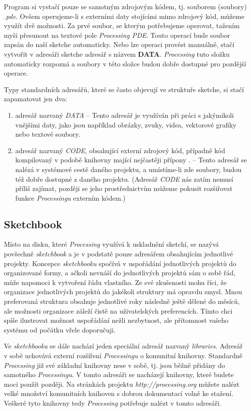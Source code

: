 \documentclass[10pt,twoside=true,open=right,cleardoublepage=empty,chapterprefix=true]{scrbook}
\newcommand{\pododdil}[1]{\subsection{#1}\index{#1}\label{#1}}
\newcommand{\slovnik}[1]{\textbf{\gls{#1}}\index{#1}\label{#1}}
\newcommand{\lnb}{\linebreak}
\begin{document}
Program si vystačí pouze se samotným zdrojovým kódem, tj. souborem (soubory) {\em *.pde}. Ovšem operujeme-li s externími daty stojícími mimo zdrojový kód, můžeme využít dvě možnosti. Za prvé soubor, se kterým potřebujeme operovat, tažením myši přesunout na textové pole {\em Processing PDE}. Touto operací bude soubor zapsán do naší sketche automaticky. Nebo lze operaci provést manuálně, stačí vytvořit v adresáři sketche adresář \lnb s názvem \slovnik{DATA}. {\em Processing} tuto složku automaticky rozpozná a soubory v této složce budou dobře dostupné pro pozdější operace.

Typy standardních adresářů, které se často objevují ve struktuře sketche, si stačí zapamatovat jen dva:

\begin{enumerate}
\item
adresář nazvaný {\em DATA} -- Tento adresář je využíván při práci s jakýmikoli vnějšími daty, jako jsou například obrázky, zvuky, videa, vektorové grafiky nebo textové soubory.

\item
adresář nazvaný {\em CODE}, obsahující externí zdrojový kód, případně kód kompilovaný v podobě knihovny mající nejčastěji přípony \lnb {\em *.java, *.class, *.jre}. -- Tento adresář se nalézá v systémové cestě daného projektu, a umístíme-li zde soubory, budou též dobře dostupné z daného projektu. (Adresář {\em CODE} nás zatím nemusí příliš zajímat, později se jeho prostřednictvím můžeme pokusit rozšiřovat funkce {\em Processingu} externím kódem.)

\end{enumerate}


\pododdil{Sketchbook}

Místo na disku, které {\em Processing} využívá k uskladnění sketchí, se nazývá povšechně {\em sketchbook} a je v podstatě pouze adresářem obsahujícím jednotlivé projekty. Koncepce {\em sketchbooku} spočívá v uspořádání jednotlivých projektů do organizované formy, a ačkoli nevnáší do jednotlivých projektů sám o sobě řád, může napomoci k vytvoření řádu vlastního. Ze své zkušenosti mohu říci, že organizace jednotlivých projektů do jakékoli struktury má opravdu smysl. Mnou preferovaná struktura obsahuje jednotlivé roky následně ještě dělené do měsíců, ale možnosti organizace záleží čistě na uživatelských preferencích. Tímto chci spíše ilustrovat možnost uspořádání nežli nezbytnost, ale přítomnost vašeho systému od počátku vřele doporučuji.

Ve {\em sketchbooku} se dále nachází jeden speciální adresář nazvaný {\em libraries}. Adresář v sobě uchovává externí rozšíření {\em Processingu} o komunitní knihovny. Standardně {\em Processing} již své základní knihovny nese v sobě, \lnb tj. jsou běžně přidány do samotného {\em Processingu}. V tomto adresáři se nacházejí knihovny, které budete moci použít později. Na stránkách projektu {\em http://processing.org} můžete nalézt velké množství komunitních knihoven s dobrou dokumentací volně ke stažení. Veškeré tyto knihovny tedy {\em Processing} potřebuje nalézt v tomto adresáři.
\end{document}
